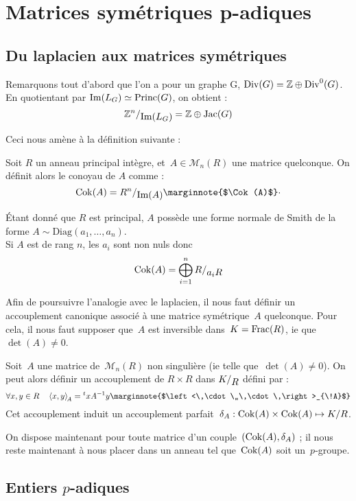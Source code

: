 \section{Matrices symétriques p-adiques}
\subsection{Du laplacien aux matrices symétriques}

Remarquons tout d'abord que l'on a pour un graphe G, $\operatorname{Div}(G) = \mathbb{Z} \oplus \operatorname{Div}^0(G)$.\\[0.2cm]
En quotientant par $\operatorname{Im}(L_G) \simeq \operatorname{Princ}(G)$, on obtient : 
\[ \quotient{\mathbb{Z}^n}{\Im(L_G)} = \mathbb{Z} \oplus \Jac(G) \]

Ceci nous amène à la définition suivante : 
\begin{defi}
Soit $R$ un anneau principal intègre, et~$A\in\mathcal{M}_n(R)$ une matrice quelconque.
On définit alors le conoyau de $A$ comme : 
\[\Cok(A) = \quotient{R^n}{\Im(A)} \text{\marginnote{$\Cok(A)$}}\cdot\]
\end{defi}

\begin{rem}
\'Etant donné que $R$ est principal, $A$ possède une forme normale de Smith de la forme $A \sim \text{Diag}(a_1,\dots,a_n)$.\\
Si $A$ est de rang $n$, les $a_i$ sont non nuls donc 
\[\Cok(A) = \bigoplus_{i=1}^n{\quotient{R}{a_iR}}\]
\end{rem}

Afin de poursuivre l'analogie avec le laplacien, il nous faut définir un accouplement canonique associé à une matrice symétrique~$A$ quelconque. Pour cela, il nous faut supposer que~$A$ est inversible dans~$K = \operatorname{Frac}(R)$, ie que~$\det(A)\neq0$.
\begin{defi}
Soit~$A$ une matrice de~$\mathcal{M}_n(R)$ non singulière (ie telle que~$\det(A)\neq 0$).
On peut alors définir un accouplement de $R\times R$ dans $\quotient{K}{R}$ défini par :
\[ \forall x,y\in R\quad \left<x,y\right>_{\!A} = {}^txA^{-1}y \text{\marginnote{$\left<\,\cdot\,,\,\cdot\,\right>_{\!A}$}}\]
Cet accouplement induit un accouplement parfait~$\delta_A : \operatorname{Cok}(A)\times\operatorname{Cok}(A) \mapsto K/R$.
\end{defi}

On dispose maintenant pour toute matrice d'un couple~$(\operatorname{Cok}(A), \delta_A)$ ; il nous reste maintenant à nous placer dans un anneau tel que~$\operatorname{Cok}(A)$ soit un~$p$-groupe.

\subsection{Entiers $p$-adiques}

